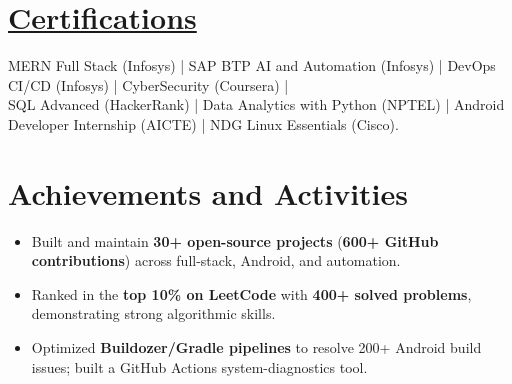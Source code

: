 \documentclass[a4paper,10pt]{article}
\begin{document}
\section{\href{https://certificates7878.glitch.me/}{Certifications}}
\textrm{
\hspace{0pt}MERN Full Stack (Infosys) | SAP BTP AI and Automation (Infosys) | DevOps CI/CD (Infosys) | CyberSecurity (Coursera) | \\[2pt]
SQL Advanced (HackerRank) | Data Analytics with Python (NPTEL) | Android Developer Internship (AICTE) | NDG Linux Essentials (Cisco).
}

\section{Achievements and Activities}
\begin{itemize}[nosep, itemsep=1pt]
    \item Built and maintain \textbf{30+ open-source projects} (\textbf{600+ GitHub contributions}) across full-stack, Android, and automation.
    \item Ranked in the \textbf{top 10\% on LeetCode} with \textbf{400+ solved problems}, demonstrating strong algorithmic skills.
    \item Optimized \textbf{Buildozer/Gradle pipelines} to resolve 200+ Android build issues; built a GitHub Actions system-diagnostics tool.
\end{itemize}
\end{document}
